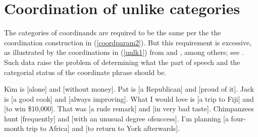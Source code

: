 \section{Coordination of unlike categories}\label{unlikessec}\label{coordination:sec-unlikes}

The categories of coordinands are required to be the same per the the coordination construction in (\ref{coordparam2}).
But this requirement is excessive, as illustrated by  the coordinations in (\ref{unlk1}) from
\citet[]{bayer} and %
\citet[]{rodney}, %
among  others; see \citet[--170]{Chaves2013b-u}.
 Such data raise the problem of determining what the part of speech and the categorial status of the coordinate phrase should be.

\eal
\label{unlk1}
\ex Kim is [alone] and [without money].
\ex Pat is [a Republican] and [proud of it].
\ex Jack is [a good cook] and [always improving].
\ex What I would love is [a trip to Fiji] and [to win \$10,000].
\ex That was [a rude remark] and [in very bad taste].
\ex Chimpanzees hunt [frequently] and [with an unusual degree of\newline success].
\ex I'm planning [a four-month trip to Africa] and [to return to York after\-wards].
\zl

%
%
%
%
%


